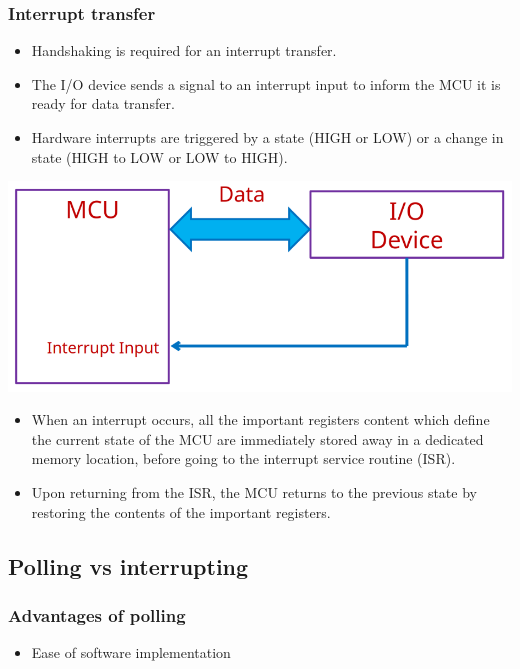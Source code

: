 \documentclass[11pt]{article}
\begin{document}
\subsubsection{Interrupt transfer}
\label{sec:orgadb503f}
\begin{itemize}
\item Handshaking is required for an interrupt transfer.
\item The I/O device sends a signal to an interrupt input to inform the MCU it is ready for data transfer.
\item Hardware interrupts are triggered by a state (HIGH or LOW) or a change in state (HIGH to LOW or LOW to HIGH).
\end{itemize}

\begin{center}
\includegraphics[width=.9\linewidth]{./images/interrupt-transfer-diagram.png}
\end{center}

\begin{itemize}
\item When an interrupt occurs, all the important registers content which define the current state of the MCU are immediately stored away in a dedicated memory location, before going to the interrupt service routine (ISR).
\item Upon returning from the ISR, the MCU returns to the previous state by restoring the contents of the important registers.
\end{itemize}
\subsection{Polling vs interrupting}
\label{sec:org5b9c2b7}

\subsubsection{Advantages of polling}
\label{sec:orgc498e45}
\begin{itemize}
\item Ease of software implementation
\end{itemize}
\end{document}
